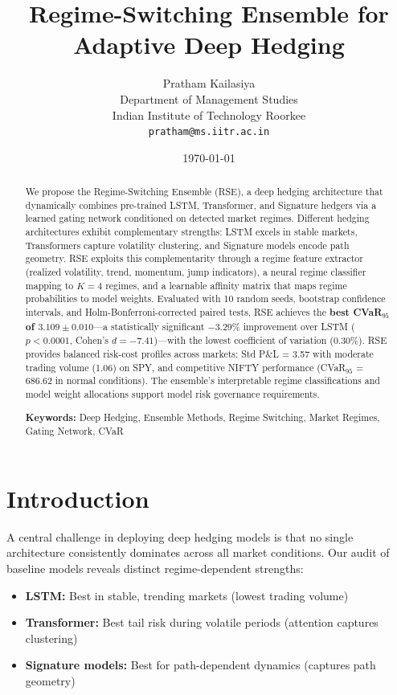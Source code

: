 \documentclass[11pt]{article}
\title{\textbf{Regime-Switching Ensemble for Adaptive Deep Hedging}}
\author{
Pratham Kailasiya \\
Department of Management Studies \\
Indian Institute of Technology Roorkee \\
\texttt{pratham@ms.iitr.ac.in}
}
\date{\today}
\begin{document}
\maketitle

\begin{abstract}
We propose the Regime-Switching Ensemble (RSE), a deep hedging architecture that dynamically combines pre-trained LSTM, Transformer, and Signature hedgers via a learned gating network conditioned on detected market regimes. Different hedging architectures exhibit complementary strengths: LSTM excels in stable markets, Transformers capture volatility clustering, and Signature models encode path geometry. RSE exploits this complementarity through a regime feature extractor (realized volatility, trend, momentum, jump indicators), a neural regime classifier mapping to $K=4$ regimes, and a learnable affinity matrix that maps regime probabilities to model weights. Evaluated with 10 random seeds, bootstrap confidence intervals, and Holm-Bonferroni-corrected paired tests, RSE achieves the \textbf{best CVaR$_{95}$ of $3.109 \pm 0.010$}---a statistically significant $-3.29\%$ improvement over LSTM ($p < 0.0001$, Cohen's $d = -7.41$)---with the lowest coefficient of variation (0.30\%). RSE provides balanced risk-cost profiles across markets: Std P\&L = 3.57 with moderate trading volume (1.06) on SPY, and competitive NIFTY performance (CVaR$_{95}$ = 686.62 in normal conditions). The ensemble's interpretable regime classifications and model weight allocations support model risk governance requirements.

\smallskip
\noindent\textbf{Keywords:} Deep Hedging, Ensemble Methods, Regime Switching, Market Regimes, Gating Network, CVaR
\end{abstract}

\section{Introduction}
\label{sec:intro}

A central challenge in deploying deep hedging models is that no single architecture consistently dominates across all market conditions. Our audit of baseline models reveals distinct regime-dependent strengths:
\begin{itemize}[noitemsep]
    \item \textbf{LSTM:} Best in stable, trending markets (lowest trading volume)
    \item \textbf{Transformer:} Best tail risk during volatile periods (attention captures clustering)
    \item \textbf{Signature models:} Best for path-dependent dynamics (captures path geometry)
\end{itemize}
\end{document}
